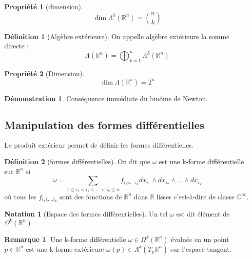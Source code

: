 \documentclass{article}
\newcommand{\C}{\mathbb{C}} %
\newcommand{\R}{\mathbb{R}} %
\theoremstyle{definition} %
\newtheorem{defi}{Définition}
\newtheorem{rmq}{Remarque}
\newtheorem{dem}{Démonstration}
\newtheorem{nota}{Notation}
\newtheorem{propri}{Propriété}
\newcommand{\lam}[1]{\Lambda^{#1} (\R^n)}
\newcommand{\OM}[1]{\Omega^{#1} (\R^n)}
\newcommand{\1}{\mathbb{1}} %
\begin{document}
\begin{propri}[dimension]
$$\dim \lam{k} = \binom{n}{k}$$
\end{propri}

\begin{defi}[Algèbre extérieure]
On appelle algèbre extérieure la somme directe :
$$\Lambda(\R^n) = \bigoplus_{k=1}^{n} \lam{k}$$
\end{defi}
\begin{propri}[Dimension]
$$\dim \Lambda(\R^n) = 2^n$$
\end{propri}

\begin{dem}
Conséquence immédiate du binôme de Newton.
\end{dem}


\subsection{Manipulation des formes différentielles}
Le produit extérieur permet de définir les formes différentielles.
\begin{defi}[formes différentielles]
On dit que $\omega$ est une k-forme différentielle sur $\R^n$ si
$$\omega = \sum_{1\leq i_1 < i_2 < ... <i_k \leq n} f_{i_1 i_2 ... i_k} dx_{i_1} \wedge dx_{i_2} \wedge ... \wedge dx_{i_k}$$
où tous les $f_{i_1 i_2 ... i_k}$ sont des fonctions de $\R^n $ dans $ \R$ lisses c'est-à-dire de classe $\C^\infty$.
\end{defi}
\begin{nota}[Espace des formes différentielles]
Un tel $\omega$ est dit élément de $\Omega^k(\R^n)$
\end{nota}
\begin{rmq}
Une k-forme différentielle $\omega \in \OM{k}$ évaluée en un point $p \in \R^n$ est une k-forme extérieure $\omega(p) \in \Lambda^k(T_p\R^n)$ sur l'espace tangent.
\end{rmq}
\end{document}
